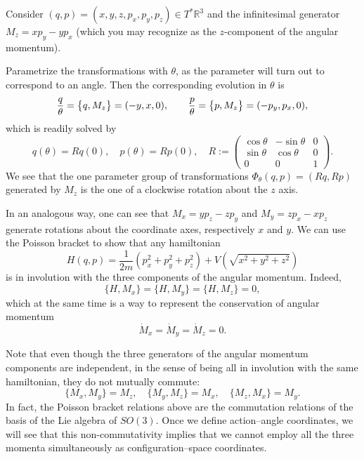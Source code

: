 \documentclass[english,fontsize=11pt,paper=a5,oneside]{scrbook}
\newcommand{\R}{\mathbb{R}}
\let\d\relax
\DeclareMathOperator{\d}{d}
\theoremstyle{definition}
\newenvironment{example}
  {\pushQED{\qed}\renewcommand{\qedsymbol}{$\lozenge$}\examplex}
  {\popQED\endexamplex}
\begin{document}
\begin{example}
    Consider $(q,p) = (x,y,z,p_x,p_y,p_z)\in T^* \R^3$ and the infinitesimal generator $M_z = x p_y - y p_x$ (which you may recognize as the $z$-component of the angular momentum).

    Parametrize the transformations with $\theta$, as the parameter will turn out to correspond to an angle. Then the corresponding evolution in $\theta$ is
    \begin{equation}
        \frac{\d q}{\d\theta} = \big\{q, M_z\big\} = (-y, x, 0),\qquad
        \frac{\d p}{\d\theta} = \big\{p, M_z\big\} = (-p_y, p_x, 0),
    \end{equation}
    which is readily solved by
    \begin{equation}
        q(\theta)= R q(0), \quad p(\theta) = R p(0), \quad
        R := \begin{pmatrix}
            \cos\theta & -\sin\theta & 0\\
            \sin\theta & \cos\theta & 0 \\
            0 & 0 & 1
        \end{pmatrix}.
    \end{equation}
    We see that the one parameter group of transformations $\Phi_\theta(q,p) = (Rq, Rp)$ generated by $M_z$ is the one of a clockwise rotation about the $z$ axis.

    In an analogous way, one can see that $M_x = yp_z-zp_y$ and $M_y = zp_x - xp_z$ generate rotations about the coordinate axes, respectively $x$ and $y$.
    We can use the Poisson bracket to show that any hamiltonian
    \begin{equation}
        H(q,p) = \frac1{2m}\left(p_x^2 + p_y^2 + p_z^2\right) + V\left(\sqrt{x^2 + y^2 + z^2}\right)
    \end{equation}
    is in involution with the three components of the angular momentum. Indeed,
    \begin{equation}
        \big\{H,M_x\big\} = \big\{H,M_y\big\} = \big\{H,M_z\big\} = 0,
    \end{equation}
    which at the same time is a way to represent the conservation of angular momentum
    \begin{equation}
        \dot M_x = \dot M_y = \dot M_z = 0.
    \end{equation}

    Note that even though the three generators of the angular momentum components are independent, in the sense of being all in involution with the same hamiltonian, they do not mutually commute:
    \begin{equation}\label{eq:commM}
        \big\{M_x, M_y\big\} = M_z, \quad
        \big\{M_y, M_z\big\} = M_x, \quad
        \big\{M_z, M_x\big\} = M_y.
    \end{equation}
    In fact, the Poisson bracket relations above are the commutation relations of the basis of the Lie algebra of $SO(3)$. %
    Once we define action--angle coordinates, we will see that this non-commutativity implies that we cannot employ all the three momenta simultaneously as configuration--space coordinates.


\end{example}
\end{document}
